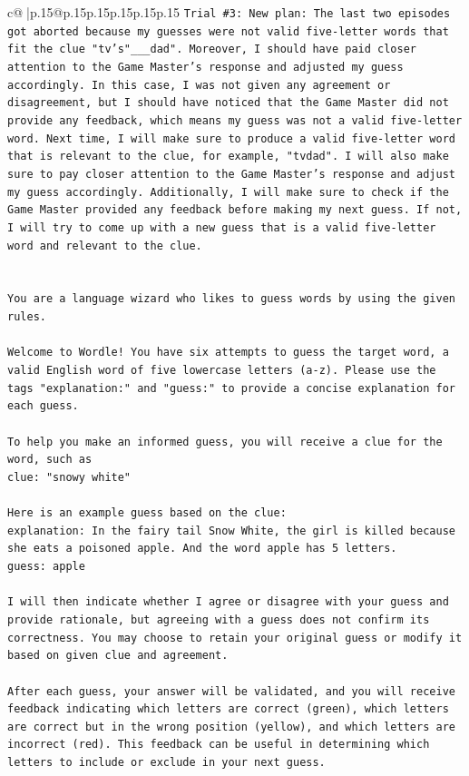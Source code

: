 \documentclass{article}
\begin{document}
{\begin{supertabular}{c@{$\;$}|p{.15\linewidth}@{}p{.15\linewidth}p{.15\linewidth}p{.15\linewidth}p{.15\linewidth}p{.15\linewidth}}
{{{\texttt{Trial \#3: New plan: The last two episodes got aborted because my guesses were not valid five{-}letter words that fit the clue "tv's"\_\_\_dad". Moreover, I should have paid closer attention to the Game Master's response and adjusted my guess accordingly. In this case, I was not given any agreement or disagreement, but I should have noticed that the Game Master did not provide any feedback, which means my guess was not a valid five{-}letter word. Next time, I will make sure to produce a valid five{-}letter word that is relevant to the clue, for example, "tvdad". I will also make sure to pay closer attention to the Game Master's response and adjust my guess accordingly. Additionally, I will make sure to check if the Game Master provided any feedback before making my next guess. If not, I will try to come up with a new guess that is a valid five{-}letter word and relevant to the clue.} \\
\\ 
\\ 
\texttt{You are a language wizard who likes to guess words by using the given rules.} \\
\\ 
\texttt{Welcome to Wordle! You have six attempts to guess the target word, a valid English word of five lowercase letters (a{-}z). Please use the tags "explanation:" and "guess:" to provide a concise explanation for each guess.} \\
\\ 
\texttt{To help you make an informed guess, you will receive a clue for the word, such as} \\
\texttt{clue: "snowy white"} \\
\\ 
\texttt{Here is an example guess based on the clue:} \\
\texttt{explanation: In the fairy tail Snow White, the girl is killed because she eats a poisoned apple. And the word apple has 5 letters.} \\
\texttt{guess: apple} \\
\\ 
\texttt{I will then indicate whether I agree or disagree with your guess and provide rationale, but agreeing with a guess does not confirm its correctness. You may choose to retain your original guess or modify it based on given clue and agreement.} \\
\\ 
\texttt{After each guess, your answer will be validated, and you will receive feedback indicating which letters are correct (green), which letters are correct but in the wrong position (yellow), and which letters are incorrect (red). This feedback can be useful in determining which letters to include or exclude in your next guess.} \\
}}}
\end{supertabular}}
\end{document}
